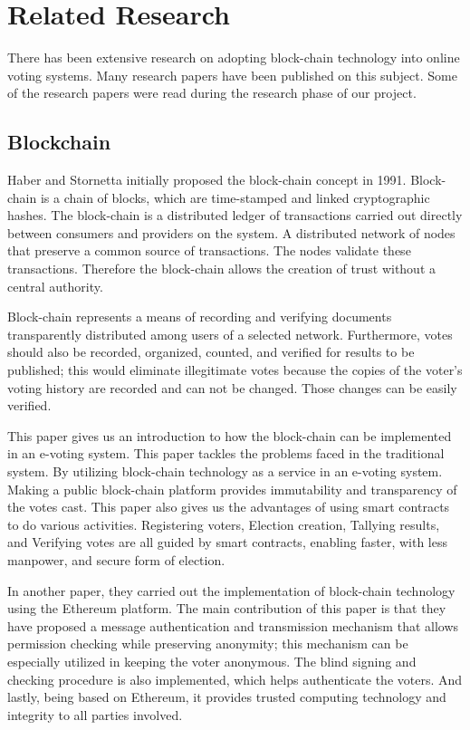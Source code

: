 \documentclass[a4paper,12pt]{report}
\begin{document}
\section{Related Research}
There has been extensive research on adopting block-chain technology into online voting systems. Many research papers have been published on this subject. Some of the research papers were read during the research phase of our project.

\subsection{Blockchain}
Haber and Stornetta initially proposed the block-chain concept in 1991. Block-chain is a chain of blocks, which are time-stamped and linked cryptographic hashes. The block-chain is a distributed ledger of transactions carried out directly between consumers and providers on the system. A distributed network of nodes that preserve a common source of transactions. The nodes validate these transactions. Therefore the block-chain allows the creation of trust without a central authority.

Block-chain represents a means of recording and verifying documents transparently distributed among users of a selected network. Furthermore, votes should also be recorded, organized, counted, and verified for results to be published; this would eliminate illegitimate votes because the copies of the voter's voting history are recorded and can not be changed. Those changes can be easily verified.

This paper gives us an introduction to how the block-chain can be implemented in an e-voting system. This paper tackles the problems faced in the traditional system. By utilizing block-chain technology as a service in an e-voting system. Making a public block-chain platform provides immutability and transparency of the votes cast. This paper also gives us the advantages of using smart contracts to do various activities. Registering voters, Election creation, Tallying results, and Verifying votes are all guided by smart contracts, enabling faster, with less manpower, and secure form of election.

In another paper, they carried out the implementation of block-chain technology using the Ethereum platform. The main contribution of this paper is that they have proposed a message authentication and transmission mechanism that allows permission checking while preserving anonymity; this mechanism can be especially utilized in keeping the voter anonymous. The blind signing and checking procedure is also implemented, which helps authenticate the voters. And lastly, being based on Ethereum, it provides trusted computing technology and integrity to all parties involved.
\end{document}
